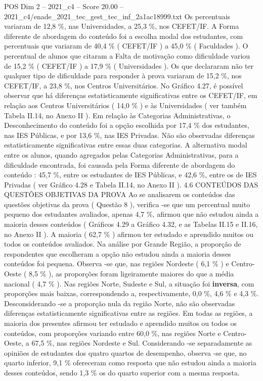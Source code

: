 \begin{textsample}{POS Dim 2 – 2021\_c4 – Score 20.00 – 2021\_c4/enade\_2021\_tec\_gest\_tec\_inf\_2a1ac18999.txt}
Os percentuais variaram de 12,8 \%, nas Universidades, a 25,3 \%, nos CEFET/IF.
A Forma diferente de abordagem do conteúdo foi a escolha modal dos estudantes, com percentuais que variaram de 40,4 \% ( CEFET/IF ) a 45,0 \% ( Faculdades ).
O percentual de alunos que citaram a Falta de motivação como dificuldade variou de 15,2 \% ( CEFET/IF ) a 17,9 \% ( Universidades ).
Os que declararam não ter qualquer tipo de dificuldade para responder à prova variaram de 15,2 \%, nos CEFET/IF, a 23,8 \%, nos Centros Universitários.
No Gráfico 4.27, é possível observar que há diferenças estatisticamente significativas entre os CEFET/IF, em relação aos Centros Universitários ( 14,0 \% ) e às Universidades ( ver também Tabela II.14, no Anexo II ).
Em relação às Categorias Administrativas, o Desconhecimento do conteúdo foi a opção escolhida por 17,4 \% dos estudantes, nas IES Públicas, e por 13,6 \%, nas IES Privadas.
Não são observadas diferenças estatisticamente significativas entre essas duas categorias.
A alternativa modal entre os alunos, quando agregados pelas Categorias Administrativas, para a dificuldade encontrada, foi causada pela Forma diferente de abordagem do conteúdo : 45,7 \%, entre os estudantes de IES Públicas, e 42,6 \%, entre os de IES Privadas ( ver Gráfico 4.28 e Tabela II.14, no Anexo II ). 4.6 CONTEÚDOS DAS QUESTÕES OBJETIVAS DA PROVA Ao se analisarem os conteúdos das questões objetivas da prova ( Questão 8 ), verifica -se que um percentual muito pequeno dos estudantes avaliados, apenas 4,7 \%, afirmou que não estudou ainda a maioria desses conteúdos ( Gráficos 4.29 a Gráfico 4.32, e as Tabelas II.15 e II.16, no Anexo II ).
A maioria ( 62,7 \% ) afirmou ter estudado e aprendido muitos ou todos os conteúdos avaliados.
Na análise por Grande Região, a proporção de respondentes que escolheram a opção não estudou ainda a maioria desses conteúdos foi pequena.
Observa -se que, nas regiões Nordeste ( 6,1 \% ) e Centro-Oeste ( 8,5 \% ), as proporções foram ligeiramente maiores do que a média nacional ( 4,7 \% ).
Nas regiões Norte, Sudeste e Sul, a situação foi \textbf{inversa}, com proporções mais baixas, correspondendo a, respectivamente, 0,0 \%, 4,6 \% e 4,3 \%.
Desconsiderando -se a proporção nula da região Norte, não são observadas diferenças estatisticamente significativas entre as regiões.
Em todas as regiões, a maioria dos presentes afirmou ter estudado e aprendido muitos ou todos os conteúdos, com proporções variando entre 60,0 \%, nas regiões Norte e Centro-Oeste, a 67,5 \%, nas regiões Nordeste e Sul.
Considerando -se separadamente as opiniões de estudantes dos quatro quartos de desempenho, observa -se que, no quarto inferior, 9,1 \% ofereceram como resposta que não estudou ainda a maioria desses conteúdos, sendo 1,3 \% os do quarto superior com a mesma resposta.

\end{textsample}
